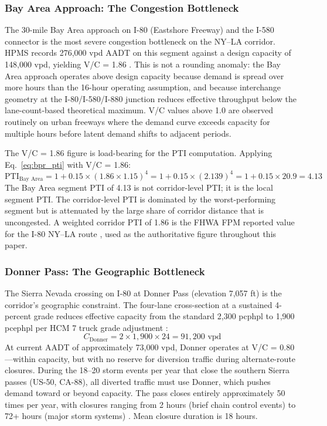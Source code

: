 \subsubsection{Bay Area Approach: The Congestion Bottleneck}

The 30-mile Bay Area approach on I-80 (Eastshore Freeway) and the I-580 connector is the most severe congestion bottleneck on the NY--LA corridor. HPMS records 276,000 vpd AADT on this segment against a design capacity of 148,000 vpd, yielding V/C = 1.86 \citep{HPMS2018}. This is not a rounding anomaly: the Bay Area approach operates above design capacity because demand is spread over more hours than the 16-hour operating assumption, and because interchange geometry at the I-80/I-580/I-880 junction reduces effective throughput below the lane-count-based theoretical maximum. V/C values above 1.0 are observed routinely on urban freeways where the demand curve exceeds capacity for multiple hours before latent demand shifts to adjacent periods.

The V/C = 1.86 figure is load-bearing for the PTI computation. Applying Eq.~\ref{eq:bpr_pti} with V/C = 1.86:
\begin{equation}
  \text{PTI}_{\text{Bay Area}} = 1 + 0.15 \times (1.86 \times 1.15)^4 = 1 + 0.15 \times (2.139)^4 = 1 + 0.15 \times 20.9 = 4.13
\end{equation}
The Bay Area segment PTI of 4.13 is not corridor-level PTI; it is the local segment PTI. The corridor-level PTI is dominated by the worst-performing segment but is attenuated by the large share of corridor distance that is uncongested. A weighted corridor PTI of 1.86 is the FHWA FPM reported value for the I-80 NY--LA route \citep{FHWA_freight2023}, used as the authoritative figure throughout this paper.

\subsubsection{Donner Pass: The Geographic Bottleneck}

The Sierra Nevada crossing on I-80 at Donner Pass (elevation 7,057 ft) is the corridor's geographic constraint. The four-lane cross-section at a sustained 4-percent grade reduces effective capacity from the standard 2,300 pcphpl to 1,900 pcephpl per HCM 7 truck grade adjustment \citep{HCM7}:
\begin{equation}
  C_{\text{Donner}} = 2 \times 1{,}900 \times 24 = 91{,}200 \text{ vpd}
\end{equation}
At current AADT of approximately 73,000 vpd, Donner operates at V/C = 0.80---within capacity, but with no reserve for diversion traffic during alternate-route closures. During the 18--20 storm events per year that close the southern Sierra passes (US-50, CA-88), all diverted traffic must use Donner, which pushes demand toward or beyond capacity. The pass closes entirely approximately 50 times per year, with closures ranging from 2 hours (brief chain control events) to 72+ hours (major storm systems) \citep{Caltrans2023}. Mean closure duration is 18 hours.

